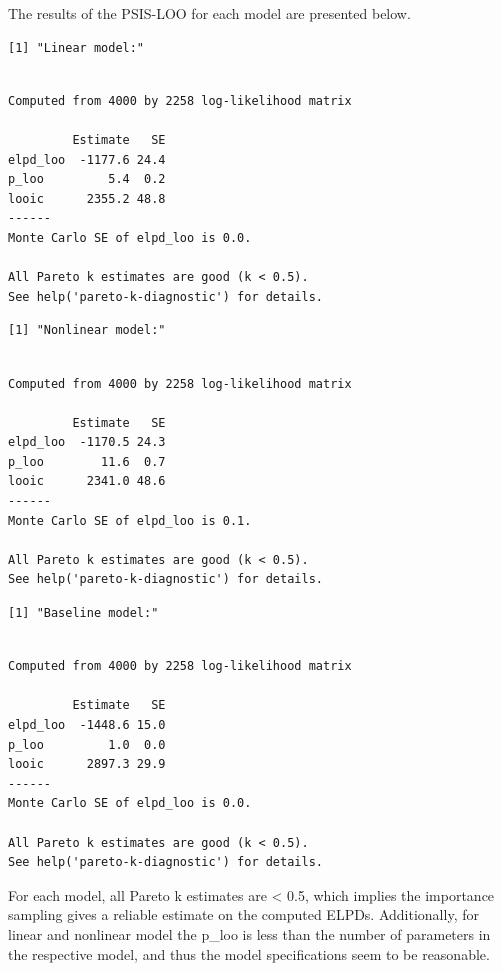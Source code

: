 \documentclass[
  letterpaper,
  DIV=11,
  numbers=noendperiod]{scrartcl}
\begin{document}
The results of the PSIS-LOO for each model are presented below.

\begin{verbatim}
[1] "Linear model:"
\end{verbatim}

\begin{verbatim}

Computed from 4000 by 2258 log-likelihood matrix

         Estimate   SE
elpd_loo  -1177.6 24.4
p_loo         5.4  0.2
looic      2355.2 48.8
------
Monte Carlo SE of elpd_loo is 0.0.

All Pareto k estimates are good (k < 0.5).
See help('pareto-k-diagnostic') for details.
\end{verbatim}

\begin{verbatim}
[1] "Nonlinear model:"
\end{verbatim}

\begin{verbatim}

Computed from 4000 by 2258 log-likelihood matrix

         Estimate   SE
elpd_loo  -1170.5 24.3
p_loo        11.6  0.7
looic      2341.0 48.6
------
Monte Carlo SE of elpd_loo is 0.1.

All Pareto k estimates are good (k < 0.5).
See help('pareto-k-diagnostic') for details.
\end{verbatim}

\begin{verbatim}
[1] "Baseline model:"
\end{verbatim}

\begin{verbatim}

Computed from 4000 by 2258 log-likelihood matrix

         Estimate   SE
elpd_loo  -1448.6 15.0
p_loo         1.0  0.0
looic      2897.3 29.9
------
Monte Carlo SE of elpd_loo is 0.0.

All Pareto k estimates are good (k < 0.5).
See help('pareto-k-diagnostic') for details.
\end{verbatim}

For each model, all Pareto k estimates are \textless{} 0.5, which
implies the importance sampling gives a reliable estimate on the
computed ELPDs. Additionally, for linear and nonlinear model the p\_loo
is less than the number of parameters in the respective model, and thus
the model specifications seem to be reasonable.
\end{document}
